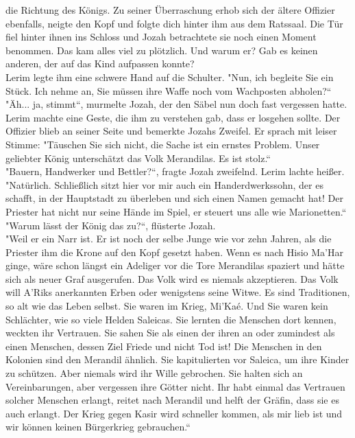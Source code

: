 die Richtung des Königs. Zu seiner Überraschung erhob sich der ältere Offizier ebenfalls, neigte 
den Kopf und folgte dich hinter ihm aus dem Ratssaal. Die Tür fiel hinter ihnen ins Schloss und 
Jozah betrachtete sie noch einen Moment benommen. Das kam alles viel zu plötzlich. Und warum er? Gab 
es keinen anderen, der auf das Kind aufpassen konnte?\\
Lerim legte ihm eine schwere Hand auf die Schulter. "Nun, ich begleite Sie ein Stück. Ich nehme an, 
Sie müssen ihre Waffe noch vom Wachposten abholen?``\\
"Äh... ja, stimmt``, murmelte Jozah, der den Säbel nun doch fast vergessen hatte.\\
Lerim machte eine Geste, die ihm zu verstehen gab, dass er losgehen sollte. Der Offizier blieb an 
seiner Seite und bemerkte Jozahs Zweifel. Er sprach mit leiser Stimme: "Täuschen Sie sich nicht, 
die Sache ist ein ernstes Problem. Unser geliebter König unterschätzt das Volk Merandilas. Es ist 
stolz.``\\
"Bauern, Handwerker und Bettler?``, fragte Jozah zweifelnd.
Lerim lachte heißer. "Natürlich. Schließlich sitzt hier vor mir auch ein Handerdwerkssohn, der es 
schafft, in der Hauptstadt zu überleben und sich einen Namen gemacht hat! Der Priester hat nicht 
nur seine Hände im Spiel, er steuert uns alle wie Marionetten.``\\
"Warum lässt der König das zu?``, flüsterte Jozah.\\
"Weil er ein Narr ist. Er ist noch der selbe Junge wie vor zehn Jahren, als die Priester ihm die 
Krone auf den Kopf gesetzt haben. Wenn es nach Hisio Ma'Har ginge, wäre schon längst ein 
Adeliger vor die Tore Merandilas spaziert und hätte sich als neuer Graf ausgerufen. Das Volk wird 
es niemals akzeptieren. Das Volk will A'Riks anerkannten Erben oder wenigstens seine Witwe. Es sind 
Traditionen, so alt wie das Leben selbst. Sie waren im Krieg, Mi'Kaé. Und Sie waren kein 
Schlächter, wie so viele Helden Saleicas. Sie lernten die Menschen dort kennen, weckten ihr 
Vertrauen. Sie sahen Sie als einen der ihren an oder zumindest als einen Menschen, dessen Ziel 
Friede und nicht Tod ist! Die Menschen in den Kolonien sind den Merandil ähnlich. Sie kapitulierten 
vor Saleica, um ihre Kinder zu schützen. Aber niemals wird ihr Wille gebrochen. Sie halten sich an 
Vereinbarungen, aber vergessen ihre Götter nicht. Ihr habt einmal das Vertrauen solcher Menschen 
erlangt, reitet nach Merandil und helft der Gräfin, dass sie es auch erlangt. Der Krieg gegen Kasir 
wird schneller kommen, als mir lieb ist und wir können keinen Bürgerkrieg gebrauchen.``\\
